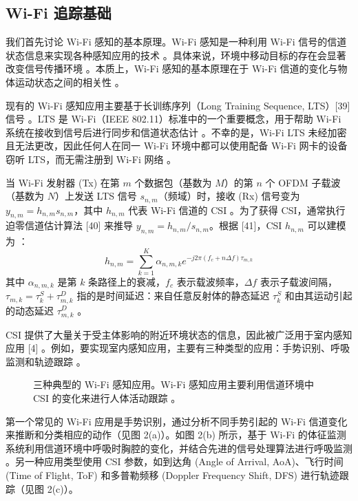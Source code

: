 \documentclass[journal]{IEEEtran}
\begin{document}
\subsection{Wi-Fi 追踪基础}
我们首先讨论 Wi-Fi 感知的基本原理。Wi-Fi 感知是一种利用 Wi-Fi 信号的信道状态信息来实现各种感知应用的技术 。具体来说，环境中移动目标的存在会显著改变信号传播环境 。本质上，Wi-Fi 感知的基本原理在于 Wi-Fi 信道的变化与物体运动状态之间的相关性 。

现有的 Wi-Fi 感知应用主要基于长训练序列（Long Training Sequence, LTS）[39] 信号 。LTS 是 Wi-Fi（IEEE 802.11）标准中的一个重要概念，用于帮助 Wi-Fi 系统在接收到信号后进行同步和信道状态估计 。不幸的是，Wi-Fi LTS 未经加密且无法更改，因此任何人在同一 Wi-Fi 环境中都可以使用配备 Wi-Fi 网卡的设备窃听 LTS，而无需注册到 Wi-Fi 网络 。

当 Wi-Fi 发射器 (Tx) 在第 $m$ 个数据包（基数为 $M$）的第 $n$ 个 OFDM 子载波（基数为 $N$）上发送 LTS 信号 $s_{n,m}$（频域）时，接收 (Rx) 信号变为 $y_{n,m}=h_{n,m}s_{n,m}$，其中 $h_{n,m}$ 代表 Wi-Fi 信道的 CSI 。为了获得 CSI，通常执行迫零信道估计算法 [40] 来推导 $y_{n,m}=h_{n,m}/s_{n,m}$。根据 [41]，CSI $h_{n,m}$ 可以建模为 ：
\begin{equation}
h_{n,m}=\sum_{k=1}^{K}\alpha_{n,m,k}e^{-j2\pi(f_{c}+n\Delta f)\tau_{m,k}}
\end{equation}
其中 $\alpha_{n,m,k}$ 是第 $k$ 条路径上的衰减，$f_{c}$ 表示载波频率，$\Delta f$ 表示子载波间隔，$\tau_{m,k}=\tau_{k}^{S}+\tau_{m,k}^{D}$ 指的是时间延迟：来自任意反射体的静态延迟 $\tau_{k}^{S}$ 和由其运动引起的动态延迟 $\tau_{m,k}^{D}$ 。

CSI 提供了大量关于受主体影响的附近环境状态的信息，因此被广泛用于室内感知应用 [4] 。例如，要实现室内感知应用，主要有三种类型的应用：手势识别、呼吸监测和轨迹跟踪 。

\begin{figure}[htbp]
\centering
\caption{三种典型的 Wi-Fi 感知应用。Wi-Fi 感知应用主要利用信道环境中 CSI 的变化来进行人体活动跟踪 。}
\label{fig:applications}
\end{figure}

第一个常见的 Wi-Fi 应用是手势识别，通过分析不同手势引起的 Wi-Fi 信道变化来推断和分类相应的动作（见图 2(a)）。如图 2(b) 所示，基于 Wi-Fi 的体征监测系统利用信道环境中呼吸时胸腔的变化，并结合先进的信号处理算法进行呼吸监测 。另一种应用类型使用 CSI 参数，如到达角 (Angle of Arrival, AoA)、飞行时间 (Time of Flight, ToF) 和多普勒频移 (Doppler Frequency Shift, DFS) 进行轨迹跟踪（见图 2(c)）。
\end{document}
